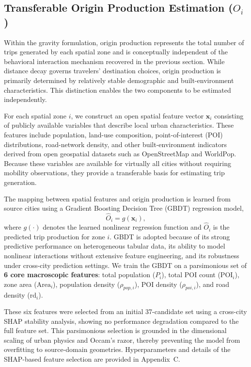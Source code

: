 \subsection{Transferable Origin Production Estimation (\texorpdfstring{$O_i$}{O\_i})}\label{sec:origin_outflow}

Within the gravity formulation, origin production represents the total number of trips generated by each spatial zone and is conceptually independent of the behavioral interaction mechanism recovered in the previous section. While distance decay governs travelers' destination choices, origin production is primarily determined by relatively stable demographic and built-environment characteristics. This distinction enables the two components to be estimated independently.

For each spatial zone $i$, we construct an open spatial feature vector $\mathbf{x}_i$ consisting of publicly available variables that describe local urban characteristics. These features include population, land-use composition, point-of-interest (POI) distributions, road-network density, and other built-environment indicators derived from open geospatial datasets such as OpenStreetMap and WorldPop. Because these variables are available for virtually all cities without requiring mobility observations, they provide a transferable basis for estimating trip generation.

The mapping between spatial features and origin production is learned from source cities using a Gradient Boosting Decision Tree (GBDT) regression model,
\begin{equation}
\hat{O}_i = g(\mathbf{x}_i),
\end{equation}
where $g(\cdot)$ denotes the learned nonlinear regression function and $\hat{O}_i$ is the predicted trip production for zone $i$. GBDT is adopted because of its strong predictive performance on heterogeneous tabular data, its ability to model nonlinear interactions without extensive feature engineering, and its robustness under cross-city prediction settings. We train the GBDT on a parsimonious set of \textbf{6 core macroscopic features}: total population ($P_i$), total POI count ($\mathrm{POI}_i$), zone area ($\mathrm{Area}_i$), population density ($\rho_{pop, i}$), POI density ($\rho_{poi, i}$), and road density ($\mathrm{rd}_i$). 

These six features were selected from an initial 37-candidate set using a cross-city SHAP stability analysis, showing no performance degradation compared to the full feature set. This parsimonious selection is grounded in the dimensional scaling of urban physics and Occam's razor, thereby preventing the model from overfitting to source-domain geometries. Hyperparameters and details of the SHAP-based feature selection are provided in Appendix~C.

